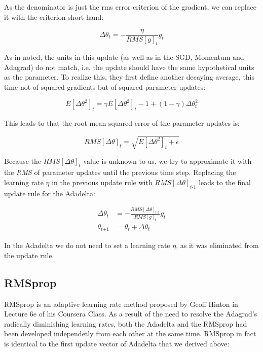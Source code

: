 \documentclass[12pt,oneside,a4paper,parskip]{scrbook}
\begin{document}
As the denominator is just the \ac{rms} error criterion of the gradient, we can replace
it with the criterion short-hand: 

\begin{equation}
  \Delta\theta_\textit{t} = -\frac{\eta}{RMS[\textit{g}]_t} \textit{g}_\textit{t}
\end{equation}

As in \cite{AdadeltaAddition} noted, the units in this update (as well as in the SGD, Momentum and Adagrad) do not match,
i.e. the update should have the same hypothetical units as the parameter. To realize this, they first define another 
decaying average, this time not of squared gradients but of squared parameter updates:

\begin{equation}
  \textit{E}[\Delta\theta^2]_t = \gamma\textit{E}[\Delta\theta^2]_t-1 + (1-\gamma)\Delta\theta^2_t
  \label{equ:adadelta_4}
\end{equation}

This leads to that the root mean squared error of the parameter updates is:

\begin{equation}
  \textit{RMS}[\Delta\theta]_t = \sqrt{\textit{E}[\Delta\theta^2]_t + \epsilon}
\end{equation}

Because the $\textit{RMS}[\Delta\theta]_t$ value is unknown to us, we try to approximate it with the \textit{RMS} of 
parameter updates until the previous time step. Replacing the learning rate $\eta$ in the previous update rule with $\textit{RMS}[\Delta\theta]_\textit{t-1}$
leads to the final update rule for the Adadelta:

\begin{equation}
  \begin{split}
  \Delta\theta_t &= - \frac{\textit{RMS}[\Delta\theta]_\textit{t-1}}{RMS[\textit{g}]_t} \textit{g}_\textit{t} \\
  \theta_\textit{t+1} &= \theta_t + \Delta\theta_t
  \end{split}
  \label{equ:adadelta_2}
\end{equation}

In the Adadelta we do not need to set a learning rate $\eta$, as it was eliminated from the update rule. \cite{overvieDiffRSLVQ}

\subsection{RMSprop}
RMSprop is an adaptive learning rate method proposed by Geoff Hinton in Lecture 6e of his Coursera Class. \cite{RMSprop_Hinton}
As a result of the need to resolve the Adagrad's radically diminishing learning rates, both the Adadelta and 
the RMSprop had been developed independetly from each other at the same time. RMSprop in fact is identical
to the first update vector of Adadelta that we derived above:
\end{document}
